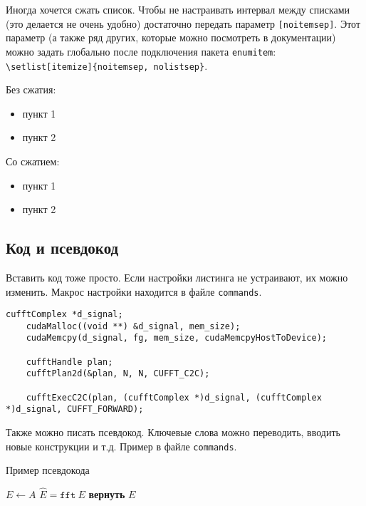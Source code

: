 Иногда хочется сжать список. Чтобы не настраивать интервал между списками (это делается не очень удобно) достаточно передать параметр \texttt{[noitemsep]}. 
Этот параметр (а также ряд других, которые можно посмотреть в документации) можно задать глобально после подключения пакета \texttt{enumitem}: \texttt{\backslash setlist[itemize]\{noitemsep, nolistsep\}}.


Без сжатия:
\begin{itemize}
    \item пункт 1
    \item пункт 2
\end{itemize}

Со сжатием:
\begin{itemize}[noitemsep]
    \item пункт 1
    \item пункт 2
\end{itemize}

\subsection{Код и псевдокод}
Вставить код тоже просто. Если настройки листинга не устраивают, их можно изменить. Макрос настройки находится в файле \texttt{commands}.

\begin{lstlisting}[caption={Пример вызова БПФ в библиотеке \texttt{CuFFT}}]
    cufftComplex *d_signal;
    cudaMalloc((void **) &d_signal, mem_size);
    cudaMemcpy(d_signal, fg, mem_size, cudaMemcpyHostToDevice);

    cufftHandle plan;
    cufftPlan2d(&plan, N, N, CUFFT_C2C);

    cufftExecC2C(plan, (cufftComplex *)d_signal, (cufftComplex *)d_signal, CUFFT_FORWARD);
\end{lstlisting}

Также можно писать псевдокод. Ключевые слова можно переводить, вводить новые конструкции и т.д. Пример в файле \texttt{commands}.
\begin{algorithm}[H]
    \caption{Пример псевдокода}
    \begin{algorithmic}[1] %
        \State $E \gets A$
        \State $\hat{E} = \texttt{fft}~E$
        \EndFor
        \State \textbf{вернуть} $E$
        \EndProcedure
    \end{algorithmic}
\end{algorithm}

